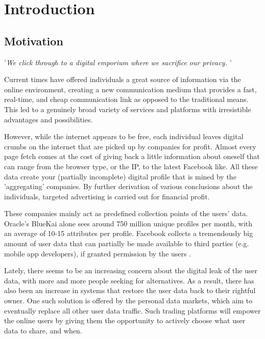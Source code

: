 \chapter{Introduction}

\section{Motivation}
\begin{center}
'\textit{We click through to a digital emporium where we sacrifice our privacy.} \cite{guardian}'
\end{center}

Current times have offered individuals a great source of information via the online environment, creating a new communication medium that provides a fast, real-time, and cheap communication link as opposed to the traditional means. This led to a genuinely broad variety of services and platforms with irresistible advantages and possibilities.

However, while the internet appears to be free, each individual leaves digital crumbs on the internet that are picked up by companies for profit. Almost every page fetch comes at the cost of giving back a little information about oneself that can range from the browser type, or the IP, to the latest Facebook like. All these data create your (partially incomplete) digital profile that is mined by the 'aggregating' companies. By further derivation of various conclusions about the individuals, targeted advertising is carried out for financial profit. 

These companies mainly act as predefined collection points of the users' data. Oracle's BlueKai alone sees around 750 million unique profiles per month, with an average of 10-15 attributes per profile. \cite{bluekai} Facebook collects a tremendously big amount of user data \cite{facebook} that can partially be made available to third parties (e.g. mobile app developers), if granted permission by the users \cite{facebookprivacy}.

Lately, there seems to be an increasing concern about the digital leak of the user data, with more and more people seeking for alternatives. As a result, there has also been an increase in systems that restore the user data back to their rightful owner. One such solution is offered by the personal data markets, which aim to eventually replace all other user data traffic. Such trading platforms will empower the online users by giving them the opportunity to actively choose what user data to share, and when.

